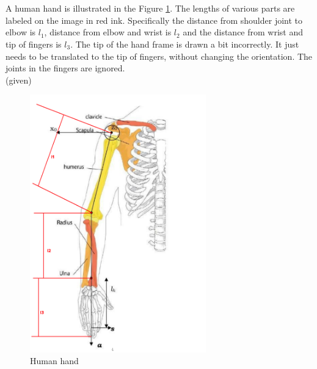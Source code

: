 \documentclass[12pt]{article}
\newcommand{\given}{{\\ \color{blue} \hspace*{\fill}(given)} \\}
\begin{document}
\section{}
A human hand is illustrated in the Figure \ref{fig:q4.1}.
The lengths of various parts are labeled on the image in red ink.
Specifically the distance from shoulder joint to elbow is $l_1$, distance from elbow and wrist is $l_2$ and the distance from wrist and tip of fingers is $l_3$.
The tip of the hand frame is drawn a bit incorrectly. It just needs to be translated to the tip of fingers, without changing the orientation.
The joints in the fingers are ignored.
\given
\begin{figure}[h]
  \centering
  \includegraphics[width=0.68\textwidth]{q4.png}
  \caption{Human hand}
  \label{fig:q4.1}
\end{figure}
\end{document}
